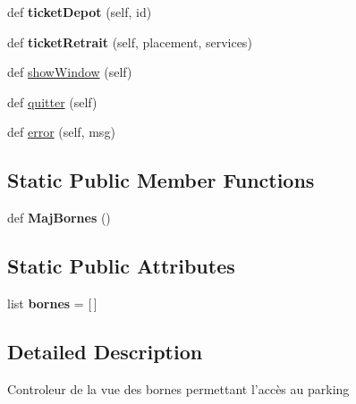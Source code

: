 \begin{DoxyCompactItemize}
\item 
\hypertarget{classc_1_1_borne_1_1_borne_a5531e9ff6db0129086cddc5816a5cab1}{}def {\bfseries ticket\+Depot} (self, id)\label{classc_1_1_borne_1_1_borne_a5531e9ff6db0129086cddc5816a5cab1}

\item 
\hypertarget{classc_1_1_borne_1_1_borne_ad63293dbe26b30d25108f5e344b9e40c}{}def {\bfseries ticket\+Retrait} (self, placement, services)\label{classc_1_1_borne_1_1_borne_ad63293dbe26b30d25108f5e344b9e40c}

\item 
def \hyperlink{classc_1_1_borne_1_1_borne_a50f22af2304ed275105cd93c4a049e56}{show\+Window} (self)
\item 
def \hyperlink{classc_1_1_borne_1_1_borne_a1f16682e3ac13d9ec8138d31d7a6181c}{quitter} (self)
\item 
def \hyperlink{classc_1_1_borne_1_1_borne_a5f82102a26c2987ef85f6699a4c6fad5}{error} (self, msg)
\end{DoxyCompactItemize}
\subsection*{Static Public Member Functions}
\begin{DoxyCompactItemize}
\item 
\hypertarget{classc_1_1_borne_1_1_borne_af7385a2e94ed06e4951a20d681d25f84}{}def {\bfseries Maj\+Bornes} ()\label{classc_1_1_borne_1_1_borne_af7385a2e94ed06e4951a20d681d25f84}

\end{DoxyCompactItemize}
\subsection*{Static Public Attributes}
\begin{DoxyCompactItemize}
\item 
\hypertarget{classc_1_1_borne_1_1_borne_a9c417fa73811c67c662910ce4436d48a}{}list {\bfseries bornes} = \mbox{[}$\,$\mbox{]}\label{classc_1_1_borne_1_1_borne_a9c417fa73811c67c662910ce4436d48a}

\end{DoxyCompactItemize}


\subsection{Detailed Description}
\begin{DoxyVerb}Controleur de la vue des bornes permettant l'accès au parking
\end{DoxyVerb}
 

